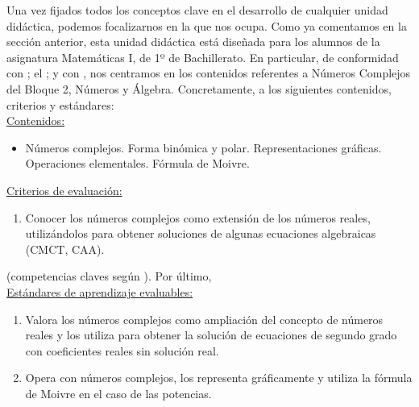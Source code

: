 \documentclass[../main.tex]{book}
\begin{document}
Una vez fijados todos los conceptos clave en el desarrollo de cualquier unidad didáctica, podemos focalizarnos en la que nos ocupa. Como ya comentamos en la sección anterior, esta unidad didáctica está diseñada para los alumnos de la asignatura Matemáticas I, de 1º de Bachillerato. En particular, de conformidad con \cite{orden1462016}; el \cite{decreto110}; y con \cite{RD1105}, nos centramos en los contenidos referentes a Números Complejos del Bloque 2, Números y Álgebra. Concretamente, a los siguientes contenidos, criterios y estándares: \\


\underline{Contenidos:}

\begin{itemize}
	\item Números complejos. Forma binómica y polar. Representaciones gráficas. Operaciones elementales. Fórmula de Moivre.
\end{itemize}

\underline{Criterios de evaluación:}

\begin{enumerate}
	\item Conocer los números complejos como extensión de los números reales, utilizándolos para obtener soluciones de algunas ecuaciones algebraicas (CMCT, CAA).
\end{enumerate}

(competencias claves según \cite{organica82013}). Por último, \\

\underline{Estándares de aprendizaje evaluables:}

\begin{enumerate}
	\item Valora los números complejos como ampliación del concepto de números reales y los utiliza para obtener la solución de ecuaciones de segundo grado con coeficientes reales sin solución real.
	\item Opera con números complejos, los representa gráficamente y utiliza la fórmula de Moivre en el caso de las potencias.
\end{enumerate}
\end{document}
